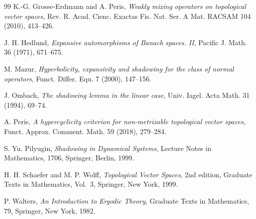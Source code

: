 \documentclass[11pt]{amsart}
\theoremstyle{definition}
\theoremstyle{remark}
\theoremstyle{plain}
\begin{document}
\begin{thebibliography}{99}
K.-G. Grosse-Erdmann and A. Peris,
\emph{Weakly mixing operators on topological vector spaces},
Rev. R. Acad. Cienc. Exactas Fis. Nat. Ser. A Mat. RACSAM 104 (2010),
413--426.

J. H. Hedlund,
\emph{Expansive automorphisms of Banach spaces. II},
Pacific J. Math. 36 (1971), 671--675.

M. Mazur,
\emph{Hyperbolicity, expansivity and shadowing for the class of normal
operators},
Funct. Differ. Equ. 7 (2000), 147--156.

J. Ombach,
\emph{The shadowing lemma in the linear case},
Univ. Iagel. Acta Math. 31 (1994), 69--74.

A. Peris,
\emph{A hypercyclicity criterion for non-metrizable topological vector spaces},
Funct. Approx. Comment. Math. 59 (2018), 279--284.

S. Yu. Pilyugin,
\emph{Shadowing in Dynamical Systems},
Lecture Notes in Mathematics, 1706, Springer, Berlin, 1999.

H. H. Schaefer and M. P. Wolff,
\emph{Topological Vector Spaces},
2nd edition, Graduate Texts in Mathematics, Vol.~3,
Springer, New York, 1999.

P. Walters,
\emph{An Introduction to Ergodic Theory},
Graduate Texts in Mathematics, 79, Springer, New York, 1982.

\end{thebibliography}
\end{document}
